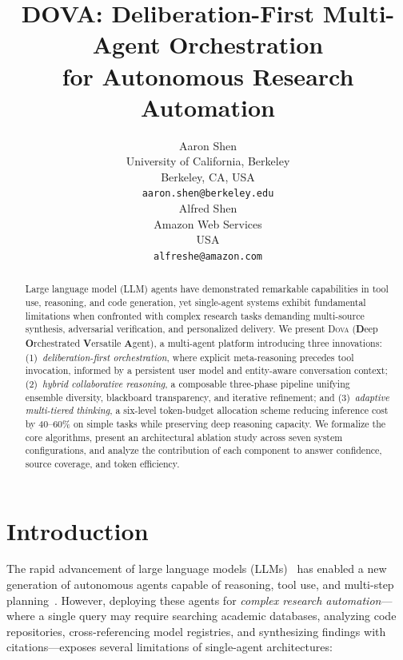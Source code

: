 \documentclass{article}
\title{DOVA: Deliberation-First Multi-Agent Orchestration\\
for Autonomous Research Automation}
\author{%
  Aaron Shen \\
  University of California, Berkeley \\
  Berkeley, CA, USA \\
  \texttt{aaron.shen@berkeley.edu} \\
  \And
  Alfred Shen \\
  Amazon Web Services \\
  USA \\
  \texttt{alfreshe@amazon.com} \\
}
\theoremstyle{plain}
\theoremstyle{definition}
\newcommand{\dova}{\textsc{Dova}}
\begin{document}

\maketitle

\begin{abstract}
Large language model (LLM) agents have demonstrated remarkable capabilities in
tool use, reasoning, and code generation, yet single-agent systems exhibit
fundamental limitations when confronted with complex research tasks demanding
multi-source synthesis, adversarial verification, and personalized delivery.
We present \dova{} (\textbf{D}eep \textbf{O}rchestrated \textbf{V}ersatile
\textbf{A}gent), a multi-agent platform introducing three innovations:
(1)~\emph{deliberation-first orchestration}, where explicit meta-reasoning
precedes tool invocation, informed by a persistent user model and entity-aware
conversation context;
(2)~\emph{hybrid collaborative reasoning}, a composable three-phase pipeline
unifying ensemble diversity, blackboard transparency, and iterative refinement;
and (3)~\emph{adaptive multi-tiered thinking}, a six-level token-budget
allocation scheme reducing inference cost by 40--60\% on simple tasks while
preserving deep reasoning capacity.
We formalize the core algorithms, present an architectural ablation study
across seven system configurations, and analyze the contribution of each
component to answer confidence, source coverage, and token efficiency.
\end{abstract}

\section{Introduction}\label{sec:intro}

The rapid advancement of large language models
(LLMs)~\citep{brown2020gpt3,anthropic2024claude} has
enabled a new generation of autonomous agents capable of reasoning, tool use,
and multi-step planning~\citep{yao2023react,schick2023toolformer}.  However,
deploying these agents for \emph{complex research automation}---where a single
query may require searching academic databases, analyzing code repositories,
cross-referencing model registries, and synthesizing findings with
citations---exposes several limitations of single-agent architectures:
\end{document}
